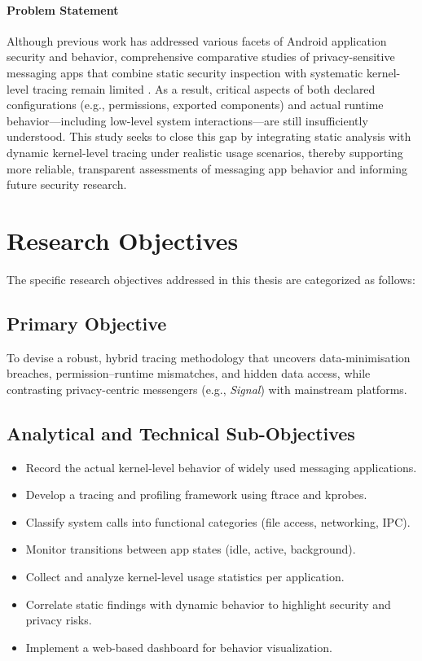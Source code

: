 \documentclass[a4paper,12pt]{report}
\begin{document}
\paragraph{Problem Statement}


Although previous work has addressed various facets of Android application security and behavior, comprehensive comparative studies of privacy-sensitive messaging apps that combine static security inspection with systematic kernel-level tracing remain limited \cite{DynamicSecurityAnalysis2023}. As a result, critical aspects of both declared configurations (e.g., permissions, exported components) and actual runtime behavior—including low-level system interactions—are still insufficiently understood. This study seeks to close this gap by integrating static analysis with dynamic kernel-level tracing under realistic usage scenarios, thereby supporting more reliable, transparent assessments of messaging app behavior and informing future security research.
\section{Research Objectives}

The specific research objectives addressed in this thesis are categorized as follows:

\subsection*{Primary Objective}

To devise a robust, hybrid tracing methodology that uncovers data-minimisation breaches, permission–runtime mismatches, and hidden data access, while contrasting privacy-centric messengers (e.g., \textit{Signal}) with mainstream platforms.

\subsection*{Analytical and Technical Sub-Objectives}
\begin{itemize}
\item Record the actual kernel-level behavior of widely used messaging applications.
\item Develop a tracing and profiling framework using ftrace and kprobes.
\item Classify system calls into functional categories (file access, networking, IPC).
\item Monitor transitions between app states (idle, active, background).
\item Collect and analyze kernel-level usage statistics per application.
\item Correlate static findings with dynamic behavior to highlight security and privacy risks.
\item Implement a web-based dashboard for behavior visualization.
\end{itemize}
\end{document}
